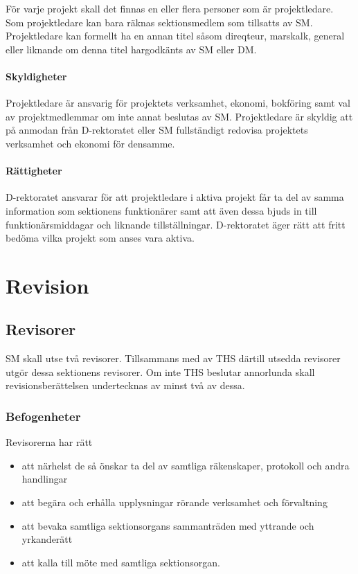 \documentclass{dgovdoc}
\begin{document}
För varje projekt skall det finnas en eller flera personer som är
projektledare. Som projektledare kan bara räknas sektionsmedlem som tillsatts
av SM. Projektledare kan formellt ha en annan titel såsom direqteur, marskalk,
general eller liknande om denna titel hargodkänts av SM eller DM.

\paragraph{Skyldigheter}

Projektledare är ansvarig för projektets verksamhet, ekonomi, bokföring samt
val av projektmedlemmar om inte annat beslutas av SM. Projektledare är
skyldig att på anmodan från D-rektoratet eller SM fullständigt redovisa
projektets verksamhet och ekonomi för densamme.

\paragraph{Rättigheter}

D-rektoratet ansvarar för att projektledare i aktiva projekt får ta del av
samma information som sektionens funktionärer samt att även dessa bjuds
in till funktionärsmiddagar och liknande tillställningar. D-rektoratet äger
rätt att fritt bedöma vilka projekt som anses vara aktiva.

\section{Revision}

\subsection{Revisorer}
\label{sec:revisorer}

SM skall utse två revisorer. Tillsammans med av THS därtill utsedda revisorer
utgör dessa sektionens revisorer. Om inte THS beslutar annorlunda skall
revisionsberättelsen undertecknas av minst två av dessa.

\subsubsection{Befogenheter}

Revisorerna har rätt

\begin{itemize}
  \item att närhelst de så önskar ta del av samtliga räkenskaper, protokoll och
    andra handlingar
  \item att begära och erhålla upplysningar rörande verksamhet och förvaltning
  \item att bevaka samtliga sektionsorgans sammanträden med yttrande och
    yrkanderätt
  \item att kalla till möte med samtliga sektionsorgan.
\end{itemize}
\end{document}
